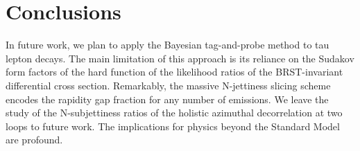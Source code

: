 \section{Conclusions}\label{sec:conclusions}

In future work, we plan to apply the Bayesian tag-and-probe method to
tau lepton decays. The main limitation of this approach is its reliance
on the Sudakov form factors of the hard function of the likelihood
ratios of the BRST-invariant differential cross section. Remarkably, the
massive N-jettiness slicing scheme encodes the rapidity gap fraction for
any number of emissions. We leave the study of the N-subjettiness ratios
of the holistic azimuthal decorrelation at two loops to future work. The
implications for physics beyond the Standard Model are profound.

